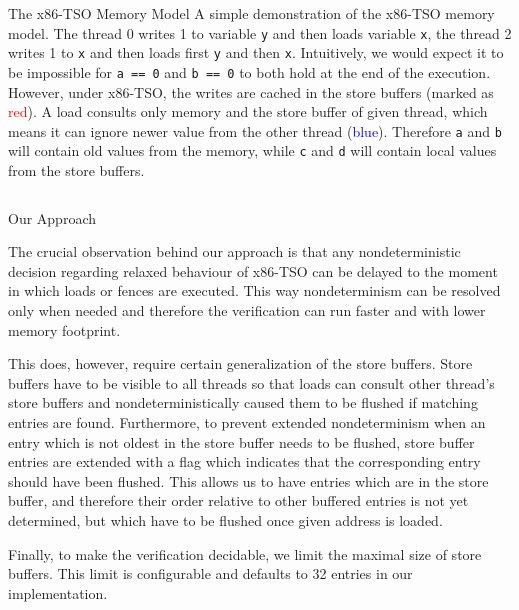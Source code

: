 \documentclass[final, 20pt, a0]{beamer}
\newlength{\onecolwid}
\newlength{\twocolwid}
\newcommand{\xtso}{x86-TSO\xspace}
\begin{document}
\begin{frame}[t]
\begin{columns}[t]
\begin{column}{\twocolwid}
\begin{block}{The \xtso Memory Model}
  A simple demonstration of the \xtso memory model. The thread 0 writes 1 to
  variable \texttt{y} and then loads variable \texttt{x}, the thread 2 writes 1
  to \texttt{x} and then loads first \texttt{y} and then \texttt{x}.
  Intuitively, we would expect it to be impossible for \texttt{a == 0} and
  \texttt{b == 0} to both hold at the end of the execution.  However, under
  \xtso, the writes are cached in the store buffers (marked as
  \textcolor{red}{red}). A load consults only memory and the store buffer of
  given thread, which means it can ignore newer value from the other thread
  (\textcolor{blue}{blue}). Therefore \texttt{a} and \texttt{b} will contain old
  values from the memory, while \texttt{c} and \texttt{d} will contain local
  values from the store buffers.

\end{block}

\begin{columns}[t,totalwidth=\twocolwid] %

\begin{column}{\onecolwid}

\begin{block}{Our Approach}

The crucial observation behind our approach is that any nondeterministic
decision regarding relaxed behaviour of \xtso can be delayed to the moment in
which loads or fences are executed. This way nondeterminism can be resolved
only when needed and therefore the verification can run faster and with lower
memory footprint.

This does, however, require certain generalization of the store buffers. Store
buffers have to be visible to all threads so that loads can consult other
thread's store buffers and nondeterministically caused them to be flushed if
matching entries are found. Furthermore, to prevent extended nondeterminism when
an entry which is not oldest in the store buffer needs to be flushed, store
buffer entries are extended with a flag which indicates that the corresponding
entry should have been flushed. This allows us to have entries which are in the
store buffer, and therefore their order relative to other buffered entries is
not yet determined, but which have to be flushed once given address is loaded.

Finally, to make the verification decidable, we limit the maximal size of store
buffers. This limit is configurable and defaults to 32 entries in our
implementation.


\end{block}
\end{column}
\end{columns}
\end{column}
\end{columns}
\end{frame}
\end{document}
